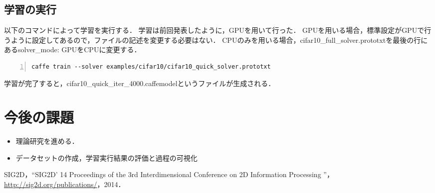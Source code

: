 \documentclass[a4paper,10pt]{jsarticle}
\begin{document}
\subsection{学習の実行}
以下のコマンドによって学習を実行する．
学習は前回発表したように，GPUを用いて行った．
GPUを用いる場合，標準設定がGPUで行うように設定してあるので，ファイルの記述を変更する必要はない．
CPUのみを用いる場合，cifar10\_full\_solver.prototxtを最後の行にあるsolver\_mode: GPUをCPUに変更する．

\begin{lstlisting}[basicstyle=\ttfamily\footnotesize, frame=single, firstnumber=1, numbers=left, breaklines=true]
caffe train --solver examples/cifar10/cifar10_quick_solver.prototxt
\end{lstlisting}

学習が完了すると，cifar10\_quick\_iter\_4000.caffemodelというファイルが生成される．

\section{今後の課題}
\begin{itemize}
 \item 理論研究を進める．
 \item データセットの作成，学習実行結果の評価と過程の可視化
\end{itemize}


\begin{thebibliography}{99}
   SIG2D，``SIG2D' 14 Proceedings of the 3rd Interdimensional Conference on 2D Information Processing ''，\url{http://sig2d.org/publications/}，2014．
\end{thebibliography}
\end{document}
